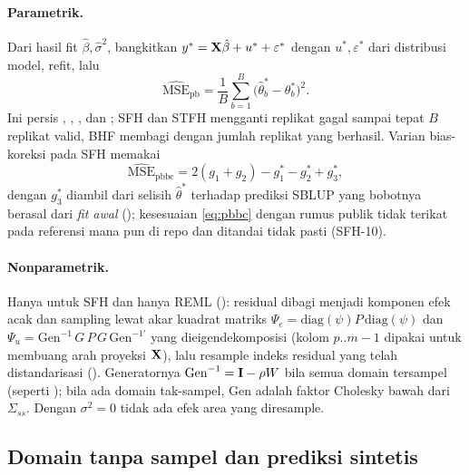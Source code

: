 \paragraph{Parametrik.} Dari hasil fit $\hat\beta,\hat\sigma^2$, bangkitkan
$y^\ast=\mathbf{X}\hat\beta+u^\ast+\varepsilon^\ast$ dengan $u^\ast,\varepsilon^\ast$
dari distribusi model, refit, lalu
\begin{equation}
  \widehat{\mathrm{MSE}}_{\mathrm{pb}}
  =\frac1B\sum_{b=1}^B\bigl(\hat\theta_b^\ast-\theta_b^\ast\bigr)^2.
  \label{eq:pbmse}
\end{equation}
Ini persis , ,
, dan ; SFH dan
STFH mengganti replikat gagal sampai tepat $B$ replikat valid, BHF membagi
dengan jumlah replikat yang berhasil. Varian
bias-koreksi pada SFH memakai
\begin{equation}
  \widehat{\mathrm{MSE}}_{\mathrm{pbbc}}
  =2(g_1+g_2)-g_1^\ast-g_2^\ast+g_3^\ast,
  \label{eq:pbbc}
\end{equation}
dengan $g_3^\ast$ diambil dari selisih $\hat\theta^\ast$ terhadap prediksi
SBLUP yang bobotnya berasal dari \emph{fit awal}
(); kesesuaian \eqref{eq:pbbc}
dengan rumus publik tidak terikat pada referensi mana pun di repo dan
ditandai tidak pasti (SFH-10).

\paragraph{Nonparametrik.} Hanya untuk SFH dan hanya REML
(): residual dibagi menjadi komponen
efek acak dan sampling lewat akar kuadrat matriks $\Psi_e=\mathrm{diag}(\psi)
P\,\mathrm{diag}(\psi)$ dan $\Psi_u=\mathrm{Gen}^{-1}\,G\,P\,G\,\mathrm{Gen}^{-1\prime}$
yang dieigendekomposisi (kolom $p..m-1$ dipakai untuk membuang arah proyeksi
$\mathbf{X}$), lalu resample indeks residual yang telah distandarisasi
(). Generatornya $\mathrm{Gen}^{-1}=\mathbf{I}-\rho W$
bila semua domain tersampel (seperti ); bila ada domain
tak-sampel, $\mathrm{Gen}$ adalah faktor Cholesky bawah dari $\Sigma_{ss}$.
Dengan $\sigma^2=0$ tidak ada efek area yang diresample.

\subsection{Domain tanpa sampel dan prediksi sintetis}\label{sec:unsampled}

